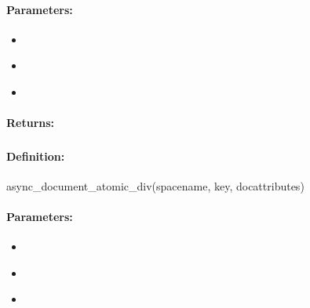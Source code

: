 \paragraph{Parameters:}
\begin{itemize}[noitemsep]
\item {}\\

\item {}\\

\item {}\\

\end{itemize}

\paragraph{Returns:}


\pagebreak
\subsubsection{}
\label{api:ruby:async_document_atomic_div}


\paragraph{Definition:}
\begin{rubycode}
async_document_atomic_div(spacename, key, docattributes)
\end{rubycode}

\paragraph{Parameters:}
\begin{itemize}[noitemsep]
\item {}\\

\item {}\\

\item {}\\

\end{itemize}

